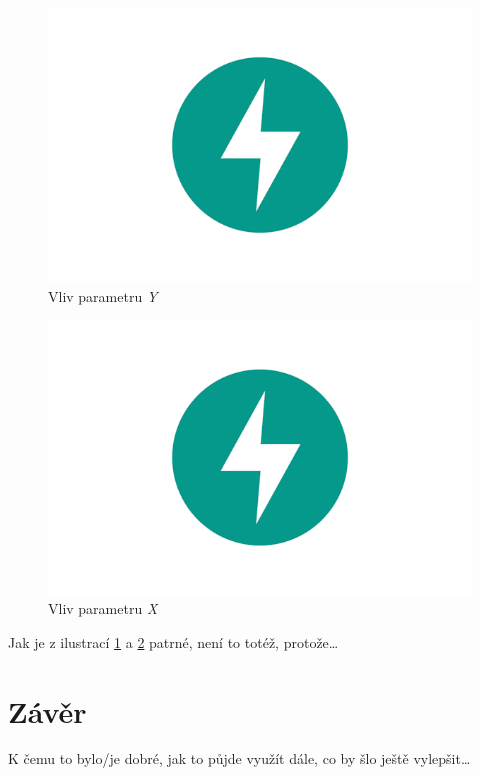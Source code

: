 \documentclass[czech]{pyt-report}
\begin{document}
\begin{figure}[h]
  \centering\leavevmode
  \includegraphics[width=.45\linewidth]{img/fastapi}\vskip-0.5cm
  \caption{Vliv parametru \emph{Y}}
  \label{fig:par-y}
\end{figure}
\begin{figure}[h]
  \centering\leavevmode
  \includegraphics[width=.45\linewidth]{img/fastapi}\vskip-0.5cm
  \caption{Vliv parametru \emph{X}}
  \label{fig:par-x}
\end{figure}

Jak je z ilustrací \ref{fig:par-y} a \ref{fig:par-x} patrné, není to totéž, protože\ldots


\section{Závěr}
K čemu to bylo/je dobré, jak to půjde využít dále, co by šlo ještě vylepšit\ldots

\nocite{zizka}
%

\end{document}
